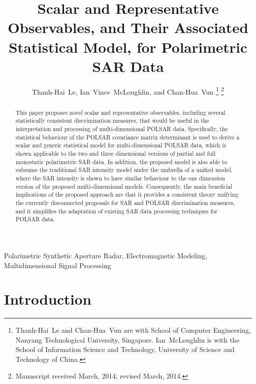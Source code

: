\documentclass[journal]{IEEEtran}
\title{
  Scalar and Representative Observables, and Their Associated Statistical Model, for Polarimetric SAR Data
}
\author{Thanh-Hai~Le,
        Ian~Vince~McLoughlin, 
	and Chan-Hua~Vun%
\thanks{Thanh-Hai~Le and Chan-Hua~Vun are with School of Computer Engineering, 
Nanyang Technological University, Singapore. Ian~McLoughlin is with the School of Information Science and Technology,
University of Science and Technology of China.
}%
\thanks{Manuscript received March, 2014; revised March, 2014.}}
\begin{document}
\maketitle

\begin{abstract}
This paper proposes novel scalar and representative observables, including several statistically consistent discrimination measures,
  that would be useful in the interpretation and processing of multi-dimensional POLSAR data.
Specifically, the statistical behaviour of the POLSAR covariance matrix determinant is used
  to derive a scalar and generic statistical model for multi-dimensional POLSAR data,
  which is shown applicable to the two and three dimensional versions of partial and full monostatic polarimetric SAR data.
In addition, the proposed model is also able to subsume the traditional SAR intensity model under the umbrella of a unified model,
  where the SAR intensity is shown to have similar behaviour to the one dimension version of the proposed multi-dimensional models.
Consequently, the main beneficial implications of the proposed approach are that
  it provides a consistent theory unifying the currently disconnected proposals for SAR and POLSAR discrimination measures,
  and it simplifies the adaptation of existing SAR data processing techniques for POLSAR data.
\end{abstract}

\begin{IEEEkeywords}
Polarimetric Synthetic Aperture Radar, Electromagnetic Modeling, Multidimensional Signal Processing  
\end{IEEEkeywords}

\IEEEpeerreviewmaketitle

\section{Introduction}
\end{document}
